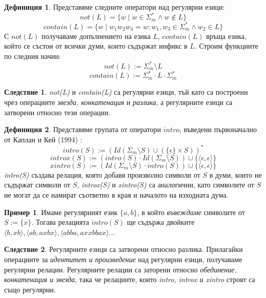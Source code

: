 \documentclass[12pt, oneside]{article}
\theoremstyle{definition}
\newtheorem{definition}{Дефиниция}[section]
\newtheorem{example}{Пример}[section]
\newtheorem{corollary}{Следствие}[section]
\begin{document}
\begin{definition}
	Представяме следните оператори над регулярни езици:
	\[ not(L) = \{ w \mid w \in \Sigma_m^* \land w \notin L \} \]
	\[ contain(L) = \{ w \mid w_1w_2w_3 = w: w_1, w_3 \in \Sigma_m^* \land w_2 \in L \} \]
	С \( not(L) \) получаваме допълнението на езика \(L\), \( contain(L) \) връща езика, който се състои от всички думи, които съдържат инфикс в \(L\). Строим функциите по следния начин:
	\[ not(L) := \Sigma_m^* \setminus L \]
	\[ contain(L) := \Sigma_m^* \cdot L \cdot \Sigma_m^* \]
\end{definition}

\begin{corollary}
	\emph{not(L)} и \emph{contain(L)} са регулярни езици, тъй като са построени чрез операциите \emph{звезда, конкатенация} и \emph{разлика}, а регулярните езици са затворени относно тези операции.
\end{corollary}

\begin{definition}
	Представяме групата от оператори \(intro\), въведени първоначално от Каплан и Кей (1994) \cite{Kaplan&Kay:94}:
	\[ intro(S) := (Id(\Sigma_m \setminus S) \cup (\{\epsilon\} \times S))^* \]
	\[ introx(S) := (intro(S) \cdot Id(\Sigma_m \setminus S)) \cup \{\langle \epsilon, \epsilon \rangle \} \]
	\[ xintro(S) := (Id(\Sigma_m \setminus S) \cdot intro(S)) \cup \{\langle \epsilon, \epsilon \rangle \} \]
	\emph{intro(S)} създава релация, която добавя произволно символи от \(S\) в думи, които не съдържат символи от \(S\), \emph{introx(S)} и \emph{xintro(S)} са аналогични, като символите от \(S\) не могат да се намират съответно в края и началото на изходната дума.
\end{definition}

\begin{example}
	Имаме регулярният език \( \{a,b\} \), в който \emph{въвеждаме} символите от \(S := \{ x \}\). Тогава релацията \(intro(S)\) ще съдържа двойките \( \langle b, xb \rangle, \langle ab, axbx \rangle, \langle abba, axxbbax \rangle \dots \)
\end{example}

\begin{corollary}
	Регулярните езици са затворени относно разлика. Прилагайки операциите за \emph{идентитет и произведение} над регулярни езици, получаваме регулярни релации. Регулярните релации са заторени относно \emph{обединение, конкатенация и звезда}, така че релациите, които \emph{intro, introx и xintro} строят са също регулярни.
\end{corollary}
\end{document}
